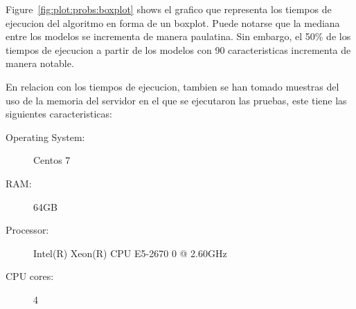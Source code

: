Figure~\ref{fig:plot:probs:boxplot} shows el grafico
que representa los tiempos de ejecucion del algoritmo en forma de un
boxplot. Puede notarse que la mediana entre los modelos
se incrementa
de manera paulatina. Sin embargo, 
el 50\% de los tiempos de ejecucion a partir de los 
modelos con 90 caracteristicas incrementa de manera notable.


En relacion con los tiempos de ejecucion, tambien se han
tomado muestras del uso de la memoria del servidor en el que se
ejecutaron las pruebas, este tiene las siguientes caracteristicas:

\begin{description}
	\item[Operating System:] Centos 7
	\item[RAM:] 64GB
	\item[Processor:] Intel(R) Xeon(R) CPU E5-2670 0 @ 2.60GHz
	\item[CPU cores:] 4
\end{description}




